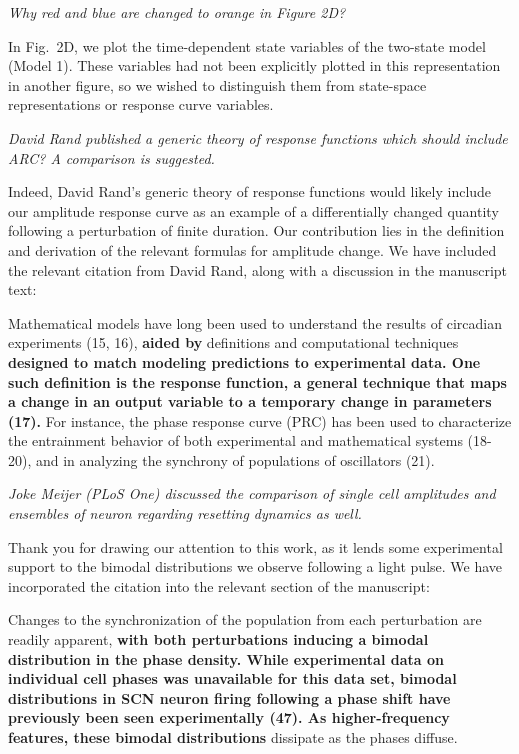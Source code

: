 \documentclass[11pt, letterpaper]{article}
\newenvironment{reviewer}{\itshape\color{gray}}{}
\newenvironment{manuscript}[1]{\begin{center}\begin{tcolorbox}[colback=green!5!white,colframe=green!75!black,width=0.8\textwidth,title={#1},breakable,fonttitle=\bfseries]}{\end{tcolorbox}\end{center}}
\begin{document}
\begin{reviewer}
Why red and blue are changed to orange in Figure 2D? 
\end{reviewer}
 
In Fig.~2D, we plot the time-dependent state variables of the two-state model (Model 1).
These variables had not been explicitly plotted in this representation in another figure, so we wished to distinguish them from state-space representations or response curve variables.

\begin{reviewer}
David Rand published a generic theory of response functions which should include ARC?
A comparison is suggested. 
\end{reviewer}

Indeed, David Rand's generic theory of response functions would likely include our amplitude response curve as an example of a differentially changed quantity following a perturbation of finite duration.
Our contribution lies in the definition and derivation of the relevant formulas for amplitude change.
We have included the relevant citation from David Rand, along with a discussion in the manuscript text:

\begin{manuscript}{Page 3}
Mathematical models have long been used to understand the results of circadian experiments (15, 16), {\bfseries aided by} definitions and computational techniques {\bfseries designed to match modeling predictions to experimental data.
One such definition is the response function, a general technique that maps a change in an output variable to a temporary change in parameters (17).}
For instance, the phase response curve (PRC) has been used to characterize the entrainment behavior of both experimental and mathematical systems (18-20), and in analyzing the synchrony of populations of oscillators (21).
\end{manuscript}

\begin{reviewer}
Joke Meijer (PLoS One) discussed the comparison of single cell amplitudes and ensembles of neuron regarding resetting dynamics as well. 
\end{reviewer}
 
Thank you for drawing our attention to this work, as it lends some experimental support to the bimodal distributions we observe following a light pulse.
We have incorporated the citation into the relevant section of the manuscript:

\begin{manuscript}{Page 14}
Changes to the synchronization of the population from each perturbation are readily apparent, {\bfseries with both perturbations inducing a bimodal distribution in the phase density.
While experimental data on individual cell phases was unavailable for this data set, bimodal distributions in SCN neuron firing following a phase shift have previously been seen experimentally (47).
As higher-frequency features, these bimodal distributions} dissipate as the phases diffuse.
\end{manuscript}
\end{document}
